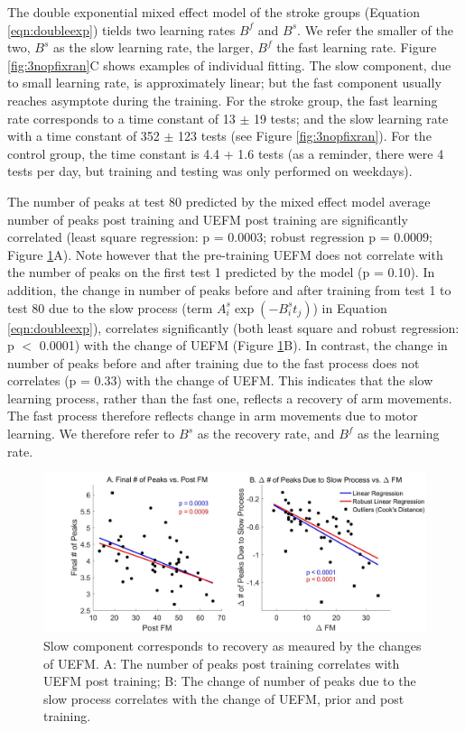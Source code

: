 The double exponential mixed effect model of the stroke groups (Equation \ref{eqn:doubleexp}) tields two learning rates $ B^f $ and $ B^s $. 
We refer the smaller of the two, $ B^s $ as the slow learning rate, the larger, $ B^f $ the fast learning rate.
Figure \ref{fig:3nopfixran}C shows examples of individual fitting.
The slow component, due to small learning rate, is approximately linear; but the fast component usually reaches asymptote during the training.
For the stroke group, the fast learning rate corresponds to a time constant of 13 $\pm$ 19 tests; and the slow learning rate with a time constant of 352 $\pm$ 123 tests (see Figure \ref{fig:3nopfixran}). 
For the control group, the time constant is 4.4 + 1.6 tests (as a reminder, there were 4 tests per day, but training and testing was only performed on weekdays). 

The number of peaks at test 80 predicted by the mixed effect model average number of peaks post training and UEFM post training are significantly correlated (least square regression: p = 0.0003; robust regression p = 0.0009; Figure \ref{fig:4slowcomponentisrecovery}A).
Note however that the pre-training UEFM does not correlate with the number of peaks on the first test 1 predicted by the model (p = 0.10).
In addition, the change in number of peaks before and after training from test 1 to test 80 due to the slow process (term $ A_i^s \exp(-B_i^s t_j) $) in Equation \ref{eqn:doubleexp}), correlates significantly (both least square and robust regression: p $<$ 0.0001) with the change of UEFM (Figure \ref{fig:4slowcomponentisrecovery}B). 
In contrast, the change in number of peaks before and after training due to the fast process does not correlates (p = 0.33) with the change of UEFM. 
This indicates that the slow learning process, rather than the fast one, reflects a recovery of arm movements. 
The fast process therefore reflects change in arm movements due to motor learning. 
We therefore refer to $ B^s $ as the recovery rate, and $ B^f $ as the learning rate.

\begin{figure}
	\centering
	\includegraphics[width=1\linewidth]{figures/4slowComponentIsRecovery}
	\caption[Slow component corresponds to recovery as meaured by the changes of UEFM]
	{Slow component corresponds to recovery as meaured by the changes of UEFM.
		A: The number of peaks post training correlates with UEFM post training;
		B: The change of number of peaks due to the slow process correlates with the change of UEFM, prior and post training.
	}
	\label{fig:4slowcomponentisrecovery}
\end{figure}

